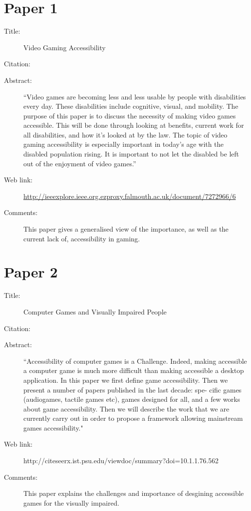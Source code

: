 \documentclass{scrartcl}
\begin{document}
\section*{Paper 1}
\begin{description}
\item[Title:] Video Gaming Accessibility
\item[Citation:] \cite{D.McPheron}
\item[Abstract:] ``Video games are becoming less and less usable by people with disabilities every day. These disabilities include cognitive, visual, and mobility. The purpose of this paper is to discuss the necessity of making video games accessible. This will be done through looking at benefits, current work for all disabilities, and how it's looked at by the law. The topic of video gaming accessibility is especially important in today's age with the disabled population rising. It is important to not let the disabled be left out of the enjoyment of video games.''
\item[Web link:] \url{http://ieeexplore.ieee.org.ezproxy.falmouth.ac.uk/document/7272966/6}
\item[Comments:] This paper gives a generalised view of the importance, as well as the current lack of, accessibility in gaming. 
\end{description}

\section*{Paper 2}
\begin{description}
\item[Title:] Computer Games and Visually Impaired People
\item[Citation:] \cite{Archambault}
\item[Abstract:] ``Accessibility of computer games is a Challenge. Indeed, making accessible a computer game is much more difficult than making accessible a desktop application. In this paper we first define game accessibility. Then we present a number of papers published in the last decade: spe- cific games (audiogames, tactile games etc), games designed for all, and a few works about game accessibility. Then we will describe the work that we are currently carry out in order to propose a framework allowing mainstream games accessibility."
\item[Web link:] http://citeseerx.ist.psu.edu/viewdoc/summary?doi=10.1.1.76.562
\item[Comments:] This paper explains the challenges and importance of desgining accessible games for the visually impaired.
\end{description}
\end{document}
